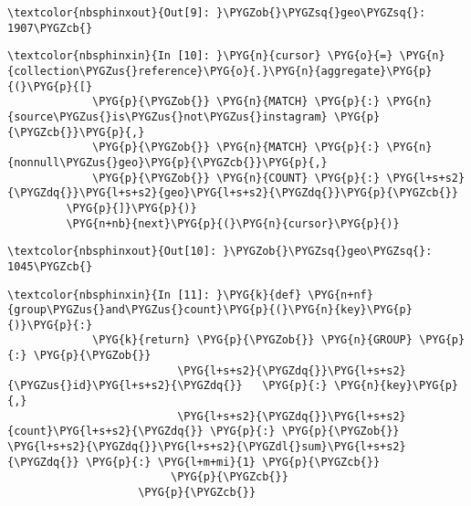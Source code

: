 \documentclass[letterpaper,10pt,english]{sphinxmanual}
\begin{document}
%
\begin{Verbatim}[commandchars=\\\{\}]
\textcolor{nbsphinxout}{Out[9]: }\PYGZob{}\PYGZsq{}geo\PYGZsq{}: 1907\PYGZcb{}
\end{Verbatim}

%
\begin{Verbatim}[commandchars=\\\{\}]
\textcolor{nbsphinxin}{In [10]: }\PYG{n}{cursor} \PYG{o}{=} \PYG{n}{collection\PYGZus{}reference}\PYG{o}{.}\PYG{n}{aggregate}\PYG{p}{(}\PYG{p}{[}
             \PYG{p}{\PYGZob{}} \PYG{n}{MATCH} \PYG{p}{:} \PYG{n}{source\PYGZus{}is\PYGZus{}not\PYGZus{}instagram} \PYG{p}{\PYGZcb{}}\PYG{p}{,}
             \PYG{p}{\PYGZob{}} \PYG{n}{MATCH} \PYG{p}{:} \PYG{n}{nonnull\PYGZus{}geo}\PYG{p}{\PYGZcb{}}\PYG{p}{,}
             \PYG{p}{\PYGZob{}} \PYG{n}{COUNT} \PYG{p}{:} \PYG{l+s+s2}{\PYGZdq{}}\PYG{l+s+s2}{geo}\PYG{l+s+s2}{\PYGZdq{}}\PYG{p}{\PYGZcb{}}
         \PYG{p}{]}\PYG{p}{)}
         \PYG{n+nb}{next}\PYG{p}{(}\PYG{n}{cursor}\PYG{p}{)}
\end{Verbatim}

%
\begin{Verbatim}[commandchars=\\\{\}]
\textcolor{nbsphinxout}{Out[10]: }\PYGZob{}\PYGZsq{}geo\PYGZsq{}: 1045\PYGZcb{}
\end{Verbatim}

%
\begin{Verbatim}[commandchars=\\\{\}]
\textcolor{nbsphinxin}{In [11]: }\PYG{k}{def} \PYG{n+nf}{group\PYGZus{}and\PYGZus{}count}\PYG{p}{(}\PYG{n}{key}\PYG{p}{)}\PYG{p}{:}
             \PYG{k}{return} \PYG{p}{\PYGZob{}} \PYG{n}{GROUP} \PYG{p}{:} \PYG{p}{\PYGZob{}}
                          \PYG{l+s+s2}{\PYGZdq{}}\PYG{l+s+s2}{\PYGZus{}id}\PYG{l+s+s2}{\PYGZdq{}}   \PYG{p}{:} \PYG{n}{key}\PYG{p}{,}
                          \PYG{l+s+s2}{\PYGZdq{}}\PYG{l+s+s2}{count}\PYG{l+s+s2}{\PYGZdq{}} \PYG{p}{:} \PYG{p}{\PYGZob{}} \PYG{l+s+s2}{\PYGZdq{}}\PYG{l+s+s2}{\PYGZdl{}sum}\PYG{l+s+s2}{\PYGZdq{}} \PYG{p}{:} \PYG{l+m+mi}{1} \PYG{p}{\PYGZcb{}}
                         \PYG{p}{\PYGZcb{}}
                    \PYG{p}{\PYGZcb{}}
\end{Verbatim}
\end{document}
